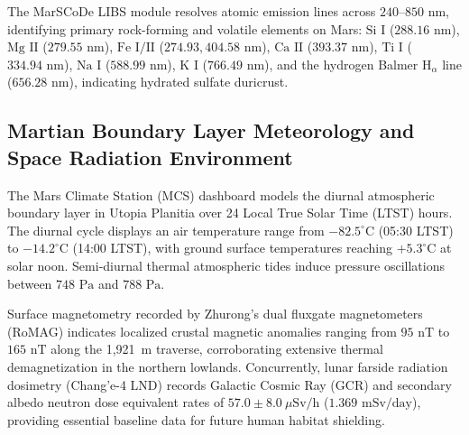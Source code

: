 The MarSCoDe LIBS module resolves atomic emission lines across $240\text{--}850\text{ nm}$, identifying primary rock-forming and volatile elements on Mars: $\text{Si~I}$ ($288.16\text{ nm}$), $\text{Mg~II}$ ($279.55\text{ nm}$), $\text{Fe~I/II}$ ($274.93, 404.58\text{ nm}$), $\text{Ca~II}$ ($393.37\text{ nm}$), $\text{Ti~I}$ ($334.94\text{ nm}$), $\text{Na~I}$ ($588.99\text{ nm}$), $\text{K~I}$ ($766.49\text{ nm}$), and the hydrogen Balmer $\text{H}_\alpha$ line ($656.28\text{ nm}$), indicating hydrated sulfate duricrust.

\subsection{Martian Boundary Layer Meteorology and Space Radiation Environment}

The Mars Climate Station (MCS) dashboard models the diurnal atmospheric boundary layer in Utopia Planitia over 24 Local True Solar Time (LTST) hours. The diurnal cycle displays an air temperature range from $-82.5^\circ\text{C}$ (05:30 LTST) to $-14.2^\circ\text{C}$ (14:00 LTST), with ground surface temperatures reaching $+5.3^\circ\text{C}$ at solar noon. Semi-diurnal thermal atmospheric tides induce pressure oscillations between $748\text{ Pa}$ and $788\text{ Pa}$.

Surface magnetometry recorded by Zhurong's dual fluxgate magnetometers (RoMAG) indicates localized crustal magnetic anomalies ranging from $95\text{ nT}$ to $165\text{ nT}$ along the 1,921~m traverse, corroborating extensive thermal demagnetization in the northern lowlands. Concurrently, lunar farside radiation dosimetry (Chang'e-4 LND) records Galactic Cosmic Ray (GCR) and secondary albedo neutron dose equivalent rates of $57.0 \pm 8.0~\mu\text{Sv/h}$ ($1.369\text{ mSv/day}$), providing essential baseline data for future human habitat shielding.
